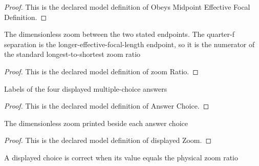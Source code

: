 \begin{proof}
  This is the declared model definition of Obeys Midpoint Effective Focal Definition.
\end{proof}
\begin{definition}
  \label{def:physics:phyx-mini-0078:phyxminiproblems-problemphyxmini0078-zoomratio}
  The dimensionless zoom between the two stated endpoints. The quarter-f separation is the longer-effective-focal-length endpoint, so it is the numerator of the standard longest-to-shortest zoom ratio
\end{definition}
\begin{proof}
  This is the declared model definition of zoom Ratio.
\end{proof}
\begin{definition}
  \label{def:physics:phyx-mini-0078:phyxminiproblems-problemphyxmini0078-answerchoice}
  Labels of the four displayed multiple-choice answers
\end{definition}
\begin{proof}
  This is the declared model definition of Answer Choice.
\end{proof}
\begin{definition}
  \label{def:physics:phyx-mini-0078:phyxminiproblems-problemphyxmini0078-answerchoice-displayedzoom}
  The dimensionless zoom printed beside each answer choice
\end{definition}
\begin{proof}
  This is the declared model definition of displayed Zoom.
\end{proof}
\begin{definition}
  \label{def:physics:phyx-mini-0078:phyxminiproblems-problemphyxmini0078-iscorrectzoomchoice}
  A displayed choice is correct when its value equals the physical zoom ratio
\end{definition}
